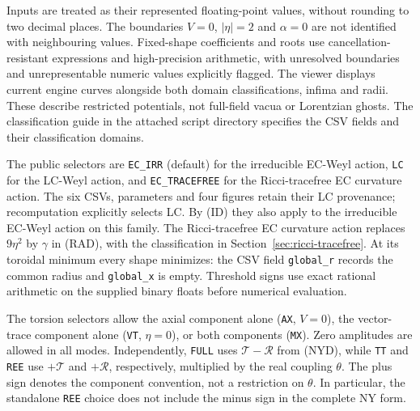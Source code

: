Inputs are treated as their represented floating-point values, without rounding to two decimal places. The boundaries $V=0$, $|\eta|=2$ and $\alpha=0$ are not identified with neighbouring values. Fixed-shape coefficients and roots use cancellation-resistant expressions and high-precision arithmetic, with unresolved boundaries and unrepresentable numeric values explicitly flagged. The viewer displays current engine curves alongside both domain classifications, infima and radii. These describe restricted potentials, not full-field vacua or Lorentzian ghosts. The classification guide in the attached script directory specifies the CSV fields and their classification domains.

The public selectors are \texttt{EC\_IRR} (default) for the irreducible EC-Weyl action, \texttt{LC} for the LC-Weyl action, and \texttt{EC\_TRACEFREE} for the Ricci-tracefree EC curvature action. The six CSVs, parameters and four figures retain their LC provenance; recomputation explicitly selects LC. By (ID) they also apply to the irreducible EC-Weyl action on this family. The Ricci-tracefree EC curvature action replaces $9\eta^2$ by $\gamma$ in (RAD), with the classification in Section~\ref{sec:ricci-tracefree}. At its toroidal minimum every shape minimizes: the CSV field \texttt{global\_r} records the common radius and \texttt{global\_x} is empty. Threshold signs use exact rational arithmetic on the supplied binary floats before numerical evaluation.

The torsion selectors allow the axial component alone (\texttt{AX}, $V=0$), the vector-trace component alone (\texttt{VT}, $\eta=0$), or both components (\texttt{MX}). Zero amplitudes are allowed in all modes. Independently, \texttt{FULL} uses $\mathcal T-\mathcal R$ from (NYD), while \texttt{TT} and \texttt{REE} use $+\mathcal T$ and $+\mathcal R$, respectively, multiplied by the real coupling $\theta$. The plus sign denotes the component convention, not a restriction on $\theta$. In particular, the standalone \texttt{REE} choice does not include the minus sign in the complete NY form.
